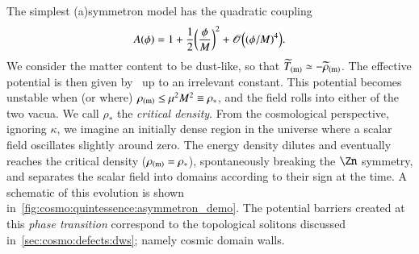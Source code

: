     The simplest (a)symmetron model has the quadratic coupling
    \begin{equation}
        A(\phi)  = 1 +\frac{1}{2} {\left( \frac{\phi}{M} \right)}^2 + \mathscr{O}\Big( {(\phi/M)}^4 \Big).
    \end{equation}
    We consider the matter content to be dust-like, so that $\widetilde{T}_\mathrm{(m)}\simeq -\widetilde{\rho}_\mathrm{(m)}$. The effective potential is then given by~\citep{hinterbichlerSymmetronCosmology2011}%
    up to an irrelevant constant. %
    This potential becomes unstable when (or where) $\rho_\mathrm{(m)}\leq \mu^2M^2\equiv \rho_\ast$, and the field rolls into either of the two vacua. We call $\rho_\ast$ the \textit{critical density}. From the cosmological perspective, ignoring $\kappa$, we imagine an initially dense region in the universe where a scalar field oscillates slightly around zero. The energy density dilutes and eventually reaches the critical density ($\rho_\mathrm{(m)}=\rho_\ast$), spontaneously breaking the $\Zn$ symmetry, and separates the scalar field into domains according to their sign at the time. A schematic of this evolution is shown in~\cref{fig:cosmo:quintessence:asymmetron_demo}. The potential barriers created at this \emph{phase transition} correspond to the topological solitons discussed in~\cref{sec:cosmo:defects:dws}; namely cosmic domain walls.




